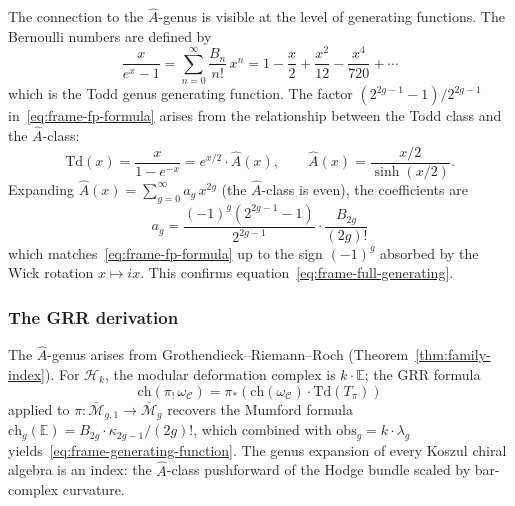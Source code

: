 The connection to the $\hat{A}$-genus is visible at the level of
generating functions.  The Bernoulli numbers are defined by
\begin{equation}\label{eq:frame-bernoulli-gf}
\frac{x}{e^x - 1} = \sum_{n=0}^{\infty} \frac{B_n}{n!}\, x^n
= 1 - \frac{x}{2} + \frac{x^2}{12} - \frac{x^4}{720} + \cdots
\end{equation}
which is the Todd genus generating function.  The factor
$(2^{2g-1}-1)/2^{2g-1}$ in~\eqref{eq:frame-fp-formula} arises
from the relationship between the Todd class and the $\hat{A}$-class:
\begin{equation}\label{eq:frame-todd-ahat}
\mathrm{Td}(x) = \frac{x}{1 - e^{-x}} = e^{x/2} \cdot \hat{A}(x),
\qquad
\hat{A}(x) = \frac{x/2}{\sinh(x/2)}.
\end{equation}
Expanding $\hat{A}(x) = \sum_{g=0}^{\infty} a_g\, x^{2g}$
(the $\hat{A}$-class is even), the coefficients are
\begin{equation}\label{eq:frame-ahat-bernoulli}
a_g = \frac{(-1)^g(2^{2g-1}-1)}{2^{2g-1}} \cdot \frac{B_{2g}}{(2g)!}
\end{equation}
which matches~\eqref{eq:frame-fp-formula} up to the sign
$(-1)^g$ absorbed by the Wick rotation $x \mapsto ix$.
This confirms equation~\eqref{eq:frame-full-generating}.

\subsubsection*{The GRR derivation}

\begin{remark}
\label{rem:frame-family-index}
The $\hat{A}$-genus arises from Grothendieck--Riemann--Roch (Theorem~\ref{thm:family-index}).  For $\mathcal{H}_k$, the modular deformation complex is $k \cdot \mathbb{E}$; the GRR formula
\begin{equation}\label{eq:frame-grr}
\mathrm{ch}(\pi_!\, \omega_{\mathcal{C}})
= \pi_*\!\left(\mathrm{ch}(\omega_{\mathcal{C}}) \cdot
\mathrm{Td}(T_\pi)\right)
\end{equation}
applied to $\pi\colon \overline{\mathcal{M}}_{g,1} \to \overline{\mathcal{M}}_g$ recovers the Mumford formula $\mathrm{ch}_g(\mathbb{E}) = B_{2g} \cdot \kappa_{2g-1}/(2g)!$, which combined with $\mathrm{obs}_g = k \cdot \lambda_g$ yields~\eqref{eq:frame-generating-function}.  The genus expansion of every Koszul chiral algebra is an index: the $\hat{A}$-class pushforward of the Hodge bundle scaled by bar-complex curvature.
\end{remark}

